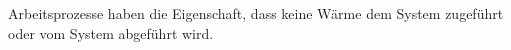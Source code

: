 

\begin{bemerkung}
    Arbeitsprozesse haben die Eigenschaft, dass keine Wärme dem System zugeführt
    oder vom System abgeführt wird.
\end{bemerkung}


